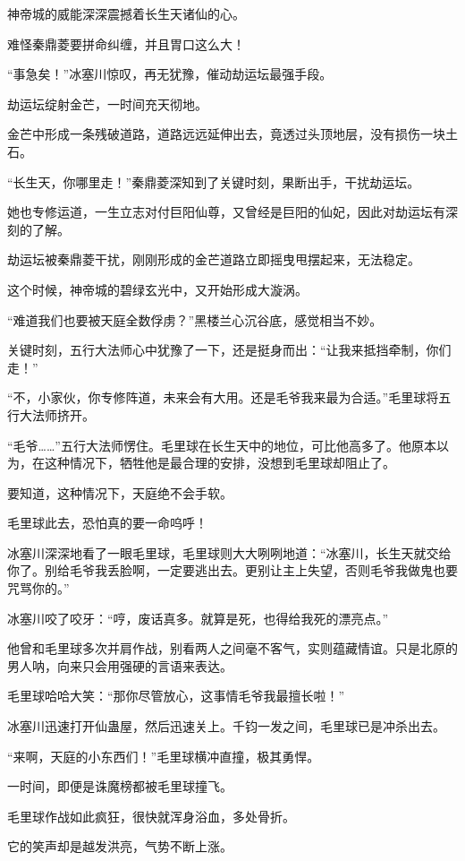 \begin{this_body}
神帝城的威能深深震撼着长生天诸仙的心。

难怪秦鼎菱要拼命纠缠，并且胃口这么大！

“事急矣！”冰塞川惊叹，再无犹豫，催动劫运坛最强手段。

劫运坛绽射金芒，一时间充天彻地。

金芒中形成一条残破道路，道路远远延伸出去，竟透过头顶地层，没有损伤一块土石。

“长生天，你哪里走！”秦鼎菱深知到了关键时刻，果断出手，干扰劫运坛。

她也专修运道，一生立志对付巨阳仙尊，又曾经是巨阳的仙妃，因此对劫运坛有深刻的了解。

劫运坛被秦鼎菱干扰，刚刚形成的金芒道路立即摇曳甩摆起来，无法稳定。

这个时候，神帝城的碧绿玄光中，又开始形成大漩涡。

“难道我们也要被天庭全数俘虏？”黑楼兰心沉谷底，感觉相当不妙。

关键时刻，五行大法师心中犹豫了一下，还是挺身而出：“让我来抵挡牵制，你们走！”

“不，小家伙，你专修阵道，未来会有大用。还是毛爷我来最为合适。”毛里球将五行大法师挤开。

“毛爷……”五行大法师愣住。毛里球在长生天中的地位，可比他高多了。他原本以为，在这种情况下，牺牲他是最合理的安排，没想到毛里球却阻止了。

要知道，这种情况下，天庭绝不会手软。

毛里球此去，恐怕真的要一命呜呼！

冰塞川深深地看了一眼毛里球，毛里球则大大咧咧地道：“冰塞川，长生天就交给你了。别给毛爷我丢脸啊，一定要逃出去。更别让主上失望，否则毛爷我做鬼也要咒骂你的。”

冰塞川咬了咬牙：“哼，废话真多。就算是死，也得给我死的漂亮点。”

他曾和毛里球多次并肩作战，别看两人之间毫不客气，实则蕴藏情谊。只是北原的男人呐，向来只会用强硬的言语来表达。

毛里球哈哈大笑：“那你尽管放心，这事情毛爷我最擅长啦！”

冰塞川迅速打开仙蛊屋，然后迅速关上。千钧一发之间，毛里球已是冲杀出去。

“来啊，天庭的小东西们！”毛里球横冲直撞，极其勇悍。

一时间，即便是诛魔榜都被毛里球撞飞。

毛里球作战如此疯狂，很快就浑身浴血，多处骨折。

它的笑声却是越发洪亮，气势不断上涨。


\end{this_body}
